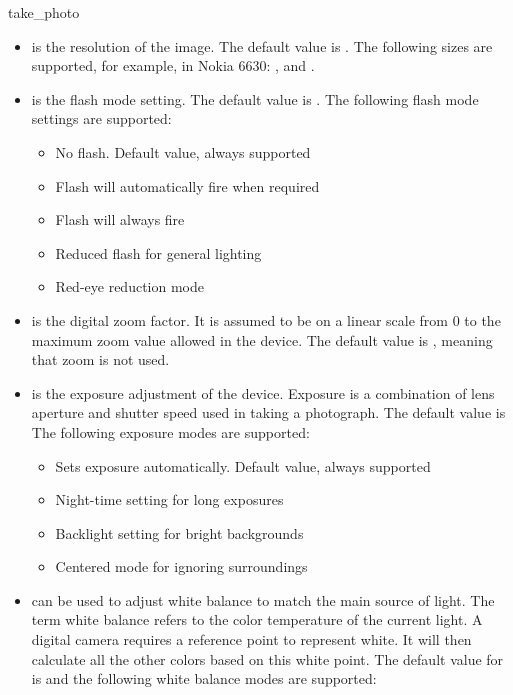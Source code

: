 \begin{funcdesc}{take_photo}{}
\begin{itemize}
\item {} is the resolution of the image. The default value is . The following sizes are supported, for example, in Nokia 6630: ,  and .
\item {} is the flash mode setting. The default value is . The following flash mode settings are supported:
	\begin{itemize}
	\item {}No flash. Default value, always supported
	\item {}Flash will automatically fire when required
	\item {}Flash will always fire
	\item {}Reduced flash for general lighting
	\item {}Red-eye reduction mode
	\end{itemize}
\item {} is the digital zoom factor. It is assumed to be on a linear scale from 0 to the maximum zoom value allowed in the device. The default value is , meaning that zoom is not used. 
\item {} is the exposure adjustment of the device. Exposure is a combination of lens aperture and shutter speed used in taking a photograph. The default value is  The following exposure modes are supported:
	\begin{itemize}
	\item {} \newline
Sets exposure automatically. Default value, always supported
	\item {} \newline
Night-time setting for long exposures
	\item {} \newline
Backlight setting for bright backgrounds
	\item {} \newline
Centered mode for ignoring surroundings
	\end{itemize}
\item {} can be used to adjust white balance to match the main source of light. The term white balance refers to the color temperature of the current light. A digital camera requires a reference point to represent white. It will then calculate all the other colors based on this white point. The default value for  is  and the following white balance modes are supported:

\end{itemize}
\end{funcdesc}
